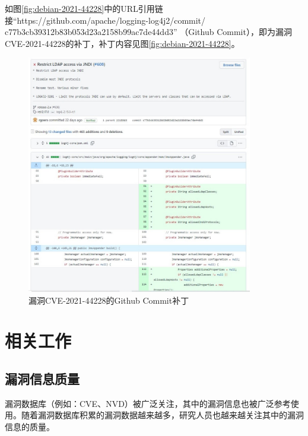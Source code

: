 如图\ref{fig:debian-2021-44228}中的URL引用链接“https://github.com/apache/logging-log4j2/commit/\\c77b3cb39312b83b053d23a2158b99ac7de44dd3” （Github Commit），即为漏洞CVE-2021-44228的补丁，补丁内容见图\ref{fig:debian-2021-44228}。

\begin{figure}[h]
    \centering
    \includegraphics[width=0.88\textwidth]{res/commit-2021-44228}
    \caption{漏洞CVE-2021-44228的Github Commit补丁}
    \label{fig:commit-2021-44228}
\end{figure}



\section{相关工作}
\subsection{漏洞信息质量}
漏洞数据库（例如：CVE、NVD）被广泛关注，其中的漏洞信息也被广泛参考使用。随着漏洞数据库积累的漏洞数据越来越多，研究人员也越来越关注其中的漏洞信息的质量。

